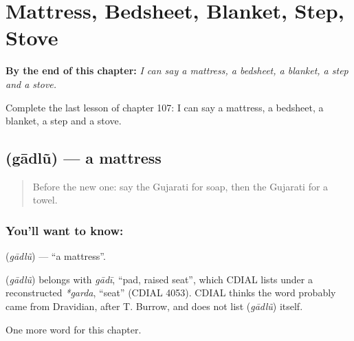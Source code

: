 
\chapter{Mattress, Bedsheet, Blanket, Step, Stove}
\label{ch:gu-mattress-bedsheet-blanket-step-stove}

\begin{chapteropening}
\textbf{By the end of this chapter:} \emph{I can say a mattress, a bedsheet, a blanket, a step and a stove.}

Complete the last lesson of chapter 107: I can say a mattress, a bedsheet, a blanket, a step and a stove.
\end{chapteropening}

\section[\texorpdfstring{\gu{ગાદલું} (gādlũ)}{ગાદલું (gādlũ)}]{ (gādlũ) — a mattress}

\label{lesson:GU-C107-gadlu}



\begin{quote}
Before the new one: say the Gujarati for soap, then the Gujarati for a towel.
\end{quote}

\subsection*{You'll want to know: }
\textbf{} (\emph{gādlũ}) — \textquotedblleft{}a mattress\textquotedblright{}.

\begin{cousinweb}
\textbf{} (\emph{gādlũ}) belongs with \emph{gādī}, \textquotedblleft{}pad, raised seat\textquotedblright{}, which CDIAL lists under a reconstructed \emph{*garda}, \textquotedblleft{}seat\textquotedblright{} (CDIAL 4053). CDIAL thinks the word probably came from Dravidian, after T. Burrow, and does not list \textbf{} (\emph{gādlũ}) itself.
\end{cousinweb}

\begin{grammarlens}[title={What you've built}]
One more word for this chapter.
\end{grammarlens}

